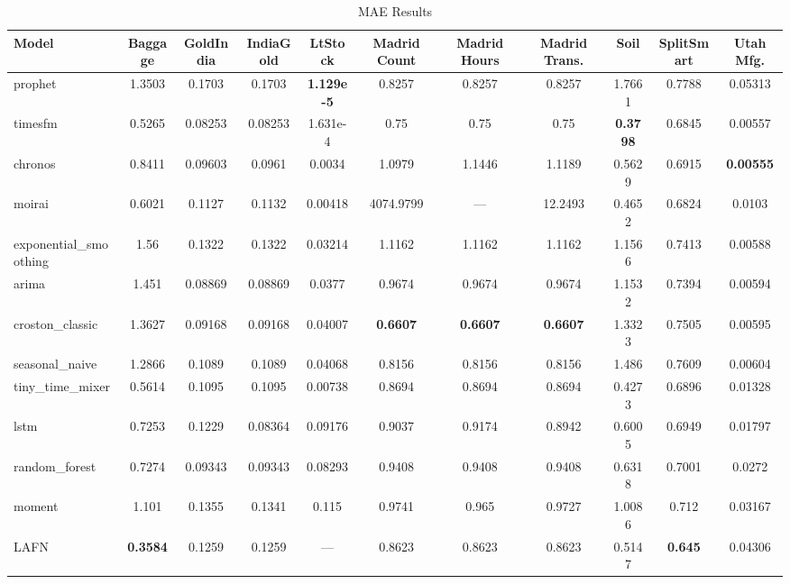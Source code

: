 
\begin{table}
\centering
\caption{MAE Results}
\label{tab:mae}
\begin{adjustbox}{width=0.95\textheight,center}
\small
\begin{tabular}{lcccccccccc}
\toprule
Model & Baggage & GoldIndia & IndiaGold & LtStock & Madrid Count & Madrid Hours & Madrid Trans. & Soil & SplitSmart & Utah Mfg. \\
\midrule
prophet & 1.3503 & 0.1703 & 0.1703 & \textbf{1.129e-5} & 0.8257 & 0.8257 & 0.8257 & 1.7661 & 0.7788 & 0.05313 \\
timesfm & 0.5265 & 0.08253 & 0.08253 & 1.631e-4 & 0.75 & 0.75 & 0.75 & \textbf{0.3798} & 0.6845 & 0.00557 \\
chronos & 0.8411 & 0.09603 & 0.0961 & 0.0034 & 1.0979 & 1.1446 & 1.1189 & 0.5629 & 0.6915 & \textbf{0.00555} \\
moirai & 0.6021 & 0.1127 & 0.1132 & 0.00418 & 4074.9799 & --- & 12.2493 & 0.4652 & 0.6824 & 0.0103 \\
exponential\_smoothing & 1.56 & 0.1322 & 0.1322 & 0.03214 & 1.1162 & 1.1162 & 1.1162 & 1.1566 & 0.7413 & 0.00588 \\
arima & 1.451 & 0.08869 & 0.08869 & 0.0377 & 0.9674 & 0.9674 & 0.9674 & 1.1532 & 0.7394 & 0.00594 \\
croston\_classic & 1.3627 & 0.09168 & 0.09168 & 0.04007 & \textbf{0.6607} & \textbf{0.6607} & \textbf{0.6607} & 1.3323 & 0.7505 & 0.00595 \\
seasonal\_naive & 1.2866 & 0.1089 & 0.1089 & 0.04068 & 0.8156 & 0.8156 & 0.8156 & 1.486 & 0.7609 & 0.00604 \\
tiny\_time\_mixer & 0.5614 & 0.1095 & 0.1095 & 0.00738 & 0.8694 & 0.8694 & 0.8694 & 0.4273 & 0.6896 & 0.01328 \\
lstm & 0.7253 & 0.1229 & 0.08364 & 0.09176 & 0.9037 & 0.9174 & 0.8942 & 0.6005 & 0.6949 & 0.01797 \\
random\_forest & 0.7274 & 0.09343 & 0.09343 & 0.08293 & 0.9408 & 0.9408 & 0.9408 & 0.6318 & 0.7001 & 0.0272 \\
moment & 1.101 & 0.1355 & 0.1341 & 0.115 & 0.9741 & 0.965 & 0.9727 & 1.0086 & 0.712 & 0.03167 \\
LAFN & \textbf{0.3584} & 0.1259 & 0.1259 & --- & 0.8623 & 0.8623 & 0.8623 & 0.5147 & \textbf{0.645} & 0.04306 \\

\end{tabular}
\end{adjustbox}
\end{table}
